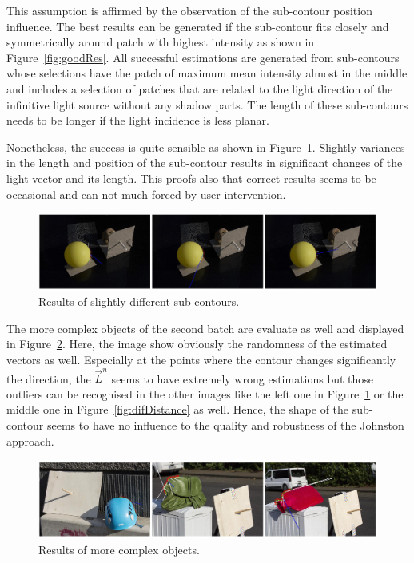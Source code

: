 This assumption is affirmed by the observation of the sub-contour position influence. The best results can be generated if the sub-contour fits closely and symmetrically around patch with highest intensity as shown in Figure~\ref{fig:goodRes}. All successful estimations are generated from sub-contours whose selections have the patch of maximum mean intensity almost in the middle and includes a selection of patches that are related to the light direction of the infinitive light source without any shadow parts. The length of these sub-contours needs to be longer if the light incidence is less planar. 

Nonetheless, the success is quite sensible as shown in Figure~\ref{fig:subcontourRes}. Slightly variances in the length and position of the sub-contour results in significant changes of the light vector and its length. This proofs also that correct results seems to be occasional and can not much forced by user intervention. 

\begin{figure}[H] 

	\center 
	\includegraphics[width=\linewidth]{Images/Lage_der Subcontour.jpg}
	\caption[Bildunterschrift]{Results of slightly different sub-contours.}	
		\label{fig:subcontourRes}	
\end{figure}

The more complex objects of the second batch are evaluate as well and displayed in Figure~\ref{fig:complexRes}. Here, the image show obviously the randomness of the estimated vectors as well. Especially at the points where the contour changes significantly the direction, the $\vec{L}^n$ seems to have extremely wrong estimations but those outliers can be recognised in the other images like the left one in Figure~\ref{fig:subcontourRes} or the middle one in Figure~\ref{fig:difDistance} as well. Hence, the shape of the sub-contour seems to have no influence to the quality and robustness of the Johnston approach.
\begin{figure}[H] 
	
	\center 
	\includegraphics[width=\linewidth]{Images/Komplex_res.jpg}
	\caption[Bildunterschrift]{Results of more complex objects.}	
	\label{fig:complexRes}	
\end{figure}



